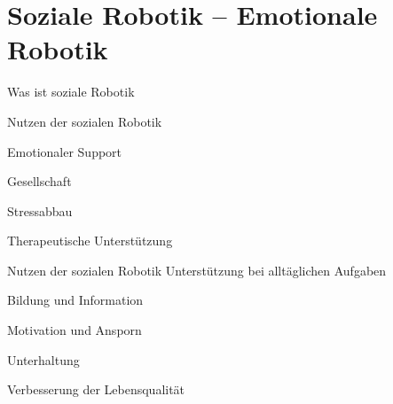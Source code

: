 \documentclass[aspectratio=169]{beamer}
\begin{document}
\section{Soziale Robotik -- Emotionale Robotik}
\begin{frame}{Was ist soziale Robotik}
\end{frame}
\begin{frame}{Nutzen der sozialen Robotik}

  Emotionaler Support

  Gesellschaft

  Stressabbau

  Therapeutische Unterstützung

\end{frame}
\begin{frame}{Nutzen der sozialen Robotik}
  Unterstützung bei alltäglichen Aufgaben

  Bildung und Information

  Motivation und Ansporn

  Unterhaltung

  Verbesserung der Lebensqualität
\end{frame}
\end{document}

